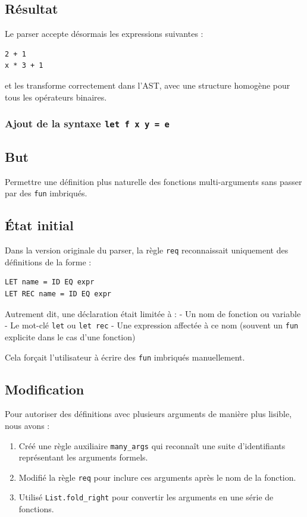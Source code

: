 \subsection*{Résultat}
Le parser accepte désormais les expressions suivantes :
\begin{lstlisting}
2 + 1
x * 3 + 1
\end{lstlisting}
et les transforme correctement dans l'AST, avec une structure homogène pour tous les opérateurs binaires.


\subsubsection{Ajout de la syntaxe \texttt{let f x y = e}}
\subsection*{But}
Permettre une définition plus naturelle des fonctions multi-arguments sans passer par des \texttt{fun} imbriqués.

\subsection*{État initial}
Dans la version originale du parser, la règle \texttt{req} reconnaissait uniquement des définitions de la forme :
\begin{lstlisting}
LET name = ID EQ expr
LET REC name = ID EQ expr
\end{lstlisting}

Autrement dit, une déclaration était limitée à :
- Un nom de fonction ou variable
- Le mot-clé \texttt{let} ou \texttt{let rec}
- Une expression affectée à ce nom (souvent un \texttt{fun} explicite dans le cas d’une fonction)

Cela forçait l’utilisateur à écrire des \texttt{fun} imbriqués manuellement.

\subsection*{Modification}
Pour autoriser des définitions avec plusieurs arguments de manière plus lisible, nous avons :
\begin{enumerate}
    \item Créé une règle auxiliaire \texttt{many\_args} qui reconnaît une suite d’identifiants représentant les arguments formels.
    \item Modifié la règle \texttt{req} pour inclure ces arguments après le nom de la fonction.
    \item Utilisé \texttt{List.fold\_right} pour convertir les arguments en une série de fonctions.
\end{enumerate}

